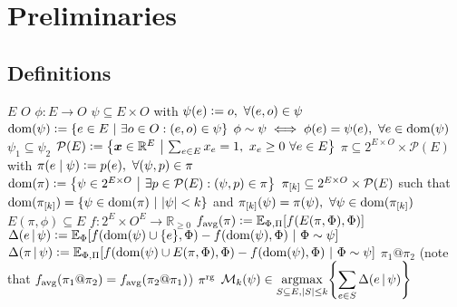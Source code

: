 ﻿%

\section{Preliminaries}

\subsection{Definitions}
\begin{description}[labelindent=0pt,leftmargin=7pt,itemindent=-2pt,itemsep=0pt]
   $E$
   $O$
   $\phi : E \to O$
   $\psi \subseteq E \times O$ with $\psi(e) \vcentcolon= o,\ \forall (e, o) \in \psi$
   $\dom(\psi) \defeq \sdef{e \in E}{\exists o \in O : (e, o) \in \psi}$
   $\phi \sim \psi \iff \phi(e) = \psi(e),\ \forall e \in \operatorname{dom}(\psi)$
   $\psi_1 \subseteq \psi_2$
   $\mathcal{P}(E) \defeq \sdef{\*x \in \mathbb{R}^E}{\sum_{e \in E} x_e = 1,\ x_e \geq 0\ \forall e \in E}$
   $\pi \subseteq 2^{E \times O} \times \mathcal{P}(E)$ with $\pi(e\mid\psi) \vcentcolon= p(e),\ \forall (\psi, p) \in \pi$
   $\dom(\pi) \defeq \sdef{\psi \in 2^{E \times O}}{\exists p \in \mathcal{P}(E) : (\psi, p) \in \pi}$
   $\pi_{[k]} \subseteq 2^{E \times O} \times \mathcal{P}(E)$ such that $\dom(\pik) = \sdef{\psi \in \dom(\pi)}{|\psi| < k}$ and $\pik(\psi) = \pi(\psi),\ \forall \psi \in \dom(\pik)$
   $E(\pi, \phi) \subseteq E$
   $f : 2^E \times O^E \to \mathbb{R}_{\geq 0}$
   $\favg(\pi) \defeq \E[\Phi,\Pi]{f(E(\pi, \Phi), \Phi)}$
   $\D{e}{\psi} \defeq \E[\Phi]{f(\dom(\psi) \cup \{e\}, \Phi) - f(\dom(\psi), \Phi)}[\Phi \sim \psi]$
   $\D{\pi}{\psi} \defeq \E[\Phi,\Pi]{f(\dom(\psi) \cup E(\pi, \Phi), \Phi) - f(\dom(\psi), \Phi)}[\Phi \sim \psi]$
   $\pi_1 @ \pi_2$ (note that $f_{\mathrm{avg}}(\pi_1 @ \pi_2) = f_{\mathrm{avg}}(\pi_2 @ \pi_1)$)
   $\pi^{\textrm{rg}}$
   $\mathcal{M}_k(\psi) \in \displaystyle\argmax_{S \subseteq E, |S| \leq k}\left\{\sum_{e \in S} \D{e}{\psi} \right\}$
\end{description}

